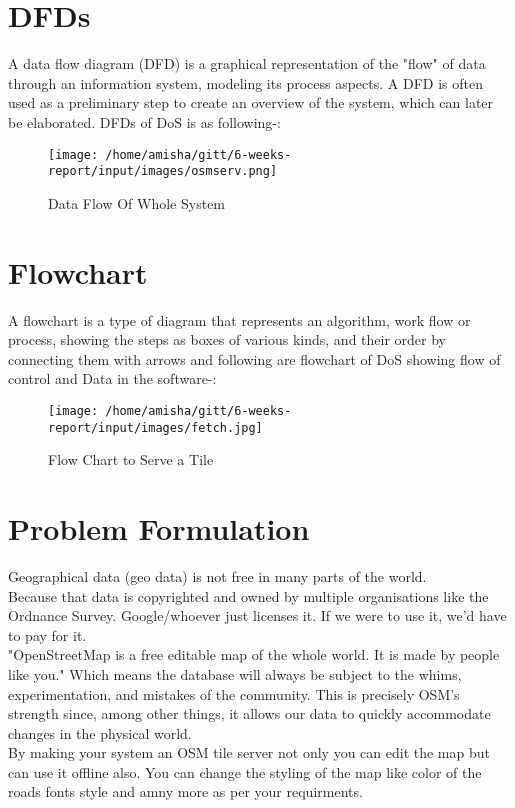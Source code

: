 \section{DFDs}
A data flow diagram (DFD) is a graphical representation of the "flow" of data through an information system, modeling its process aspects. A DFD is often used as a preliminary step to create an overview of the system, which can later be elaborated. DFDs of DoS is as following-:

\begin{figure}[ht]
\centering
\texttt{[image: /home/amisha/gitt/6-weeks-report/input/images/osmserv.png]}
\caption{Data Flow Of Whole System}
\end{figure}
\section{Flowchart}
A flowchart is a type of diagram that represents an algorithm, work flow or process, showing the steps as boxes of various kinds, and their order by connecting them with arrows
and following are flowchart of DoS showing flow of control and Data in the software-:
\begin{figure}[ht]
\centering
\texttt{[image: /home/amisha/gitt/6-weeks-report/input/images/fetch.jpg]}
\caption{Flow Chart to Serve a Tile}
\end{figure}
\hspace{-1.7em}



\section{Problem Formulation}
Geographical data (geo data) is not free in many parts of the world.\\
Because that data is copyrighted and owned by multiple organisations like the Ordnance Survey. Google/whoever just licenses it. If we were to use it, we'd have to pay for it. \\
\noindent "OpenStreetMap is a free editable map of the whole world. It is made by people like you." Which means the database will always be subject to the whims, experimentation, and mistakes of the community. This is precisely OSM's strength since, among other things, it allows our data to quickly accommodate changes in the physical world.\\
\noindent By making your system an OSM tile server not only you can edit the map but can use it offline also. You can change the styling of the map like color of the roads fonts style and amny more as per your requirments. 

